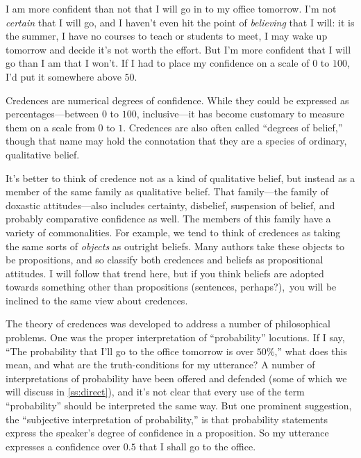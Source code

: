 
I am more confident than not that I will go in to my office tomorrow. I'm not \emph{certain} that I will go, and I haven't even hit the point of \emph{believing} that I will: it is the summer, I have no courses to teach or students to meet, I may wake up tomorrow and decide it's not worth the effort. But I'm more confident that I will go than I am that I won't. If I had to place my confidence on a scale of $0$ to $100$, I'd put it somewhere above $50$.

Credences are numerical degrees of confidence. While they could be expressed as percentages---between $0$ to $100$, inclusive---it has become customary to measure them on a scale from $0$ to $1$. Credences are also often called ``degrees of belief,'' though that name may hold the connotation that they are a species of ordinary, qualitative belief.

It's better to think of credence not as a kind of qualitative belief, but instead as a member of the same family as qualitative belief. That family---the family of doxastic attitudes---also includes certainty, disbelief, suspension of belief, and probably comparative confidence as well. The members of this family have a variety of commonalities. For example, we tend to think of credences as taking the same sorts of \emph{objects} as outright beliefs. Many authors take these objects to be propositions, and so classify both credences and beliefs as propositional attitudes. I will follow that trend here, but if you think beliefs are adopted towards something other than propositions (sentences, perhaps?),\ you will be inclined to the same view about credences.

The theory of credences was developed to address a number of philosophical problems. One was the proper interpretation of ``probability'' locutions. If I say, ``The probability that I'll go to the office tomorrow is over $50\%$,'' what does this mean, and what are the truth-conditions for my utterance? A number of interpretations of probability have been offered and defended (some of which we will discuss in \autoref{ss:direct}), and it's not clear that every use of the term ``probability'' should be interpreted the same way. But one prominent suggestion, the ``subjective interpretation of probability,'' is that probability statements express the speaker's degree of confidence in a proposition. So my utterance expresses a confidence over $0.5$ that I shall go to the office.\label{titelbaum-interpretations}

